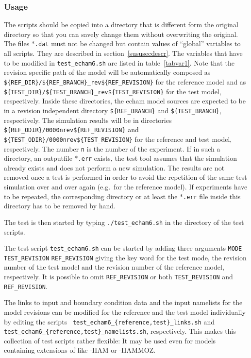 \subsubsection{Usage}

The scripts should be copied into a directory
that is different form the original \echam{} directory so that
you can savely change them without overwriting the original.
The files {\tt $\ast$.dat} must not be changed but contain values of
``global'' variables to all scripts. They are described in
section~\ref{sususecdescr}. 
The variables
that have to be modified in {\tt test\_echam6.sh} are listed in
table~\ref{tabvar1}. 
Note that the revision specific
  path of the \echam{} 
  model will be automatically composed as {\tt
    \$\{REF\_DIR\}/\$\{REF\_BRANCH\}\_rev\$\{REF\_REVISION\}} for the reference
  model and as {\tt \$\{TEST\_DIR\}/\$\{TEST\_BRANCH\}\_rev\$\{TEST\_REVISION\}}
  for the test model, respectively. Inside these directories, the
  echam model sources are expected to be in a revision independent
  directory {\tt \$\{REF\_BRANCH\}} and {\tt \$\{TEST\_BRANCH\}},
  respectively.
The simulation results will be in directories {\tt
  \$\{REF\_ODIR\}/0000nrev\$\{REF\_REVISION\}} and {\tt
  \$\{TEST\_ODIR\}/0000nrev\$\{TEST\_REVISION\}} for the reference and
test model, respectively. The number {\tt n} is the number of the
experiment. If in such a directory, an outputfile $\ast${\tt .err}
exists, the test tool assumes that the simulation already exists and
does not perform a new simulation. The results are not removed
once a test is performed in order to avoid the repetition of the same
test simulation over and over again (e.g.~for the reference model). If
experiments have to be repeated, the corresponding directory or at
least the $\ast${\tt .err} file inside this directory has to be
removed by hand.

The test is then started by typing {\tt ./test\_echam6.sh} in the directory
of the test scripts. 

The test script {\tt test\_echam6.sh} can be started by adding three
arguments {\tt MODE} {\tt TEST\_REVISION} {\tt REF\_REVISION} giving
the key word for the test mode, the revision number of the test model
and the revision number of the reference model, respectively. It is
possible to omit {\tt REF\_REVISION} or both {\tt TEST\_REVISION} and
{\tt REF\_REVISION}.

The links to input and boundary condition data and the input namelists
for the model revisions can be modified for the reference and the test
model individually by editing the scripts {\tt
  test\_echam6\_\{reference,test\}\_links.sh} and {\tt
  test\_echam6\_\{reference,test\}\_namelists.sh}, respectively. This
makes this collection of test scripts rather flexible: It may be used
even for models containing extensions of \echam{} like \echam-HAM or
\echam-HAMMOZ. 

